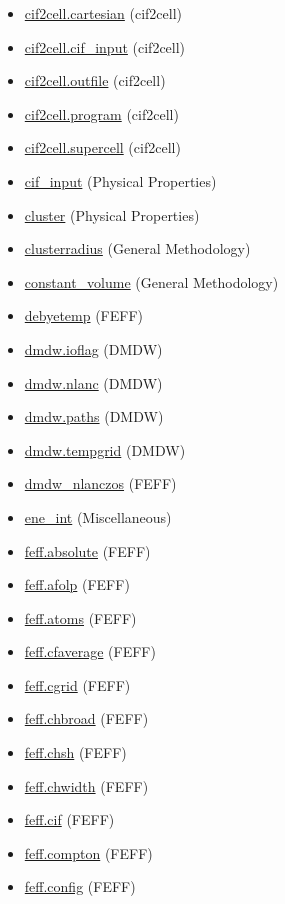 \documentclass[11pt]{article}
\begin{document}
\begin{itemize}
\item \hyperref[kw:cif2cell-cartesian]{cif2cell.cartesian} (cif2cell)
\item \hyperref[kw:cif2cell-cif-input]{cif2cell.cif\_input} (cif2cell)
\item \hyperref[kw:cif2cell-outfile]{cif2cell.outfile} (cif2cell)
\item \hyperref[kw:cif2cell-program]{cif2cell.program} (cif2cell)
\item \hyperref[kw:cif2cell-supercell]{cif2cell.supercell} (cif2cell)
\item \hyperref[kw:cif-input]{cif\_input} (Physical Properties)
\item \hyperref[kw:cluster]{cluster} (Physical Properties)
\item \hyperref[kw:clusterradius]{clusterradius} (General Methodology)
\item \hyperref[kw:constant-volume]{constant\_volume} (General Methodology)
\item \hyperref[kw:debyetemp]{debyetemp} (FEFF)
\item \hyperref[kw:dmdw-ioflag]{dmdw.ioflag} (DMDW)
\item \hyperref[kw:dmdw-nlanc]{dmdw.nlanc} (DMDW)
\item \hyperref[kw:dmdw-paths]{dmdw.paths} (DMDW)
\item \hyperref[kw:dmdw-tempgrid]{dmdw.tempgrid} (DMDW)
\item \hyperref[kw:dmdw-nlanczos]{dmdw\_nlanczos} (FEFF)
\item \hyperref[kw:ene-int]{ene\_int} (Miscellaneous)
\item \hyperref[kw:feff-absolute]{feff.absolute} (FEFF)
\item \hyperref[kw:feff-afolp]{feff.afolp} (FEFF)
\item \hyperref[kw:feff-atoms]{feff.atoms} (FEFF)
\item \hyperref[kw:feff-cfaverage]{feff.cfaverage} (FEFF)
\item \hyperref[kw:feff-cgrid]{feff.cgrid} (FEFF)
\item \hyperref[kw:feff-chbroad]{feff.chbroad} (FEFF)
\item \hyperref[kw:feff-chsh]{feff.chsh} (FEFF)
\item \hyperref[kw:feff-chwidth]{feff.chwidth} (FEFF)
\item \hyperref[kw:feff-cif]{feff.cif} (FEFF)
\item \hyperref[kw:feff-compton]{feff.compton} (FEFF)
\item \hyperref[kw:feff-config]{feff.config} (FEFF)

\end{itemize}
\end{document}
